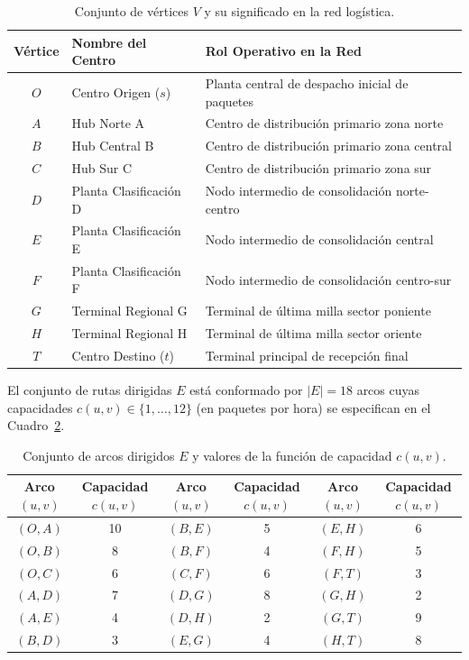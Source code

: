\documentclass[11pt,a4paper]{article}
\begin{document}
\begin{table}[H]
\centering
\caption{Conjunto de vértices $V$ y su significado en la red logística.}
\label{tab:vertices}
\begin{tabular}{cll}
\toprule
\textbf{Vértice} & \textbf{Nombre del Centro} & \textbf{Rol Operativo en la Red} \\
\midrule
$O$ & Centro Origen ($s$) & Planta central de despacho inicial de paquetes \\
$A$ & Hub Norte A & Centro de distribución primario zona norte \\
$B$ & Hub Central B & Centro de distribución primario zona central \\
$C$ & Hub Sur C & Centro de distribución primario zona sur \\
$D$ & Planta Clasificación D & Nodo intermedio de consolidación norte-centro \\
$E$ & Planta Clasificación E & Nodo intermedio de consolidación central \\
$F$ & Planta Clasificación F & Nodo intermedio de consolidación centro-sur \\
$G$ & Terminal Regional G & Terminal de última milla sector poniente \\
$H$ & Terminal Regional H & Terminal de última milla sector oriente \\
$T$ & Centro Destino ($t$) & Terminal principal de recepción final \\
\bottomrule
\end{tabular}
\end{table}

El conjunto de rutas dirigidas $E$ está conformado por $|E| = 18$ arcos cuyas capacidades $c(u, v) \in \{1, \dots, 12\}$ (en paquetes por hora) se especifican en el Cuadro~\ref{tab:arcos}.

\begin{table}[H]
\centering
\caption{Conjunto de arcos dirigidos $E$ y valores de la función de capacidad $c(u, v)$.}
\label{tab:arcos}
\begin{tabular}{cccccc}
\toprule
\textbf{Arco $(u,v)$} & \textbf{Capacidad $c(u,v)$} & \textbf{Arco $(u,v)$} & \textbf{Capacidad $c(u,v)$} & \textbf{Arco $(u,v)$} & \textbf{Capacidad $c(u,v)$} \\
\midrule
$(O, A)$ & 10 & $(B, E)$ & 5 & $(E, H)$ & 6 \\
$(O, B)$ & 8  & $(B, F)$ & 4 & $(F, H)$ & 5 \\
$(O, C)$ & 6  & $(C, F)$ & 6 & $(F, T)$ & 3 \\
$(A, D)$ & 7  & $(D, G)$ & 8 & $(G, H)$ & 2 \\
$(A, E)$ & 4  & $(D, H)$ & 2 & $(G, T)$ & 9 \\
$(B, D)$ & 3  & $(E, G)$ & 4 & $(H, T)$ & 8 \\
\bottomrule
\end{tabular}
\end{table}
\end{document}
